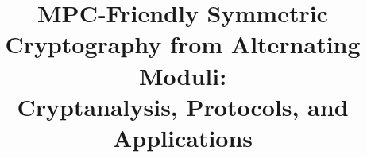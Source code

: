 \documentclass[11pt]{article}
\begin{document}
\title{MPC-Friendly Symmetric Cryptography from Alternating Moduli: \\Cryptanalysis,  Protocols, and Applications }
\author{}
\date{}

\maketitle


\end{document}
